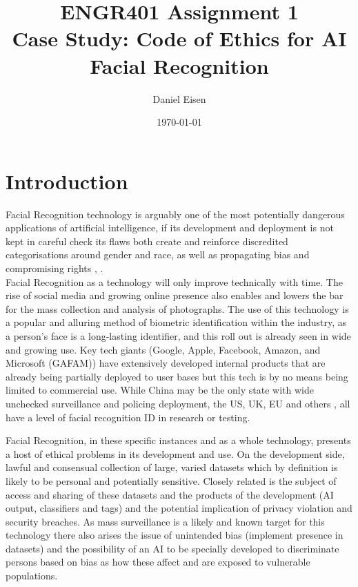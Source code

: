 \documentclass[11pt]{article}
\title{ENGR401 Assignment 1 \\ Case Study: Code of Ethics for AI \\ Facial Recognition}
\author{Daniel Eisen}
\date{\today}
\begin{document}
\maketitle
\section{Introduction}

Facial Recognition technology is arguably one of the most potentially dangerous applications of artificial intelligence, if its development and deployment is not kept in careful check its flaws both create and reinforce discredited categorisations around gender and race, as well as propagating bias and compromising rights \cite{plutonium}, \cite{nature_main}.\\

Facial Recognition as a technology will only improve technically with time. The rise of social media and growing online presence also enables and lowers the bar for the mass collection and analysis of photographs. The use of this technology is a popular and alluring method of biometric identification within the industry, as a person's face is a long-lasting identifier, and this roll out is already seen in wide and growing use. Key tech giants (Google, Apple, Facebook, Amazon, and Microsoft (GAFAM)) have extensively developed internal products that are already being partially deployed to user bases \cite{thales} but this tech is by no means being limited to commercial use. While China may be the only state with wide unchecked surveillance and policing deployment, the US, UK, EU and others \cite{nature_main},\cite{thales} all have a level of facial recognition ID in research or testing.

Facial Recognition, in these specific instances and as a whole technology, presents a host of ethical problems in its development and use. On the development side, lawful and consensual collection of large, varied datasets which by definition is likely to be personal and potentially sensitive. Closely related is the subject of access and sharing of these datasets and the products of the development (AI output, classifiers and tags) and the potential implication of privacy violation and security breaches. As mass surveillance is a likely and known target for this technology there also arises the issue of unintended bias (implement presence in datasets) and the possibility of an AI to be specially developed to discriminate persons based on bias as how these affect and are exposed to vulnerable populations.\\
\end{document}

